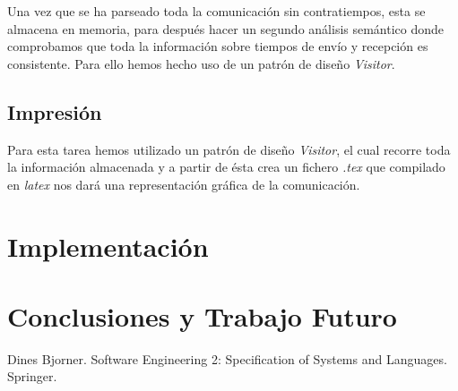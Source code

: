 \documentclass[12pt,a4paper]{report}
\begin{document}
Una vez que se ha parseado toda la comunicación sin contratiempos, esta se almacena en memoria, para después hacer un segundo análisis semántico donde comprobamos que toda la información sobre tiempos de envío y recepción es consistente. Para ello hemos hecho uso de un patrón de diseño \textit{Visitor}.

\section{Impresión}

Para esta tarea hemos utilizado un patrón de diseño \textit{Visitor}, el cual recorre toda la información almacenada y a partir de ésta crea un fichero \textit{.tex} que compilado en \textit{latex} nos dará una representación gráfica de la comunicación.

\chapter{Implementación}

\chapter{Conclusiones y Trabajo Futuro}

\begin{thebibliography}{99}
 Dines Bjorner. Software Engineering 2: Specification of Systems and Languages. Springer.
\end{thebibliography}
\end{document}
